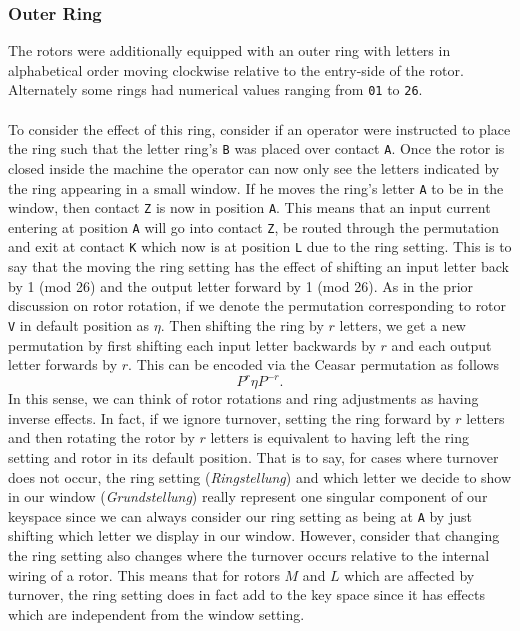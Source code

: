 \subsubsection{Outer Ring}

The rotors were additionally equipped with an outer ring with
letters in alphabetical order moving clockwise relative to the
entry-side of the rotor. Alternately some rings had numerical values
ranging from \texttt{01} to \texttt{26}.
\\\\To consider the effect of this ring,
consider if an operator were instructed to place the ring such that
the letter ring's \texttt{B} was placed over contact \texttt{A}. Once
the rotor is closed inside the machine
the operator can now only see the letters indicated by the ring
appearing in a small window. If he moves the ring's letter \texttt{A}
to be in the window, then contact \texttt{Z} is now in position
\texttt{A}. This means that an input current
entering at position \texttt{A} will go into contact \texttt{Z}, be
routed through the permutation and exit
at contact \texttt{K} which now is at position \texttt{L} due to the
ring setting. This is to say that the moving the ring
setting has the effect of shifting an input letter back by 1 (mod 26)
and the output letter forward by 1 (mod 26).
As in the prior discussion on rotor rotation, if we denote the
permutation corresponding to rotor \texttt{V} in default position as
$\eta$. Then shifting the ring by $r$ letters, we get a new
permutation by first shifting each input letter backwards by $r$ and
each output letter forwards by $r$. This can be encoded via the
Ceasar permutation as follows
\[
	{P^{r}}\eta{P^{-r}}.
\]
In this sense, we can think of rotor rotations and ring adjustments
as having inverse effects. In fact, if we ignore turnover, setting
the ring forward by $r$ letters and then rotating the rotor by $r$
letters is equivalent to having left the ring setting and rotor in
its default position. That is to say, for cases where turnover does
not occur, the ring setting (\emph{Ringstellung}) and which letter
we decide to show in our window (\emph{Grundstellung}) really
represent one singular component of our keyspace since we can always
consider our ring setting as being at \texttt{A} by just shifting
which letter we display in our window.
However, consider that changing the ring
setting also changes where the turnover occurs relative to the
internal wiring of a rotor. This means that for rotors $M$ and $L$
which are affected by turnover, the ring setting does in fact add to
the key space since it has effects which are independent from the
window setting.

